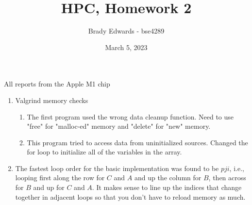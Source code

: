 \documentclass{article}
\title{HPC, Homework 2}
\author{Brady Edwards - bse4289}
\date{March 5, 2023}
\begin{document}
\maketitle
All reports from the Apple M1 chip
\begin{enumerate}
    \item 
    Valgrind memory checks
    \begin{enumerate}
        \item The first program used the wrong data cleanup function.  Need to use 
"free" for "malloc-ed" memory and "delete" for "new" memory.
        \item This program tried to access data from uninitialized sources.  Changed 
the for loop to initialize all of the variables in the array.
    \end{enumerate}

    \item 
    The fastest loop order for the basic implementation was found to be $pji$, i.e., 
looping first along the row for $C$ and $A$ and up the column for $B$, then across 
for $B$ and up for $C$ and $A$.  It makes sense to line up the indices that change 
together in adjacent loops so that you don't have to reload memory as much. 


\end{enumerate}
\end{document}
